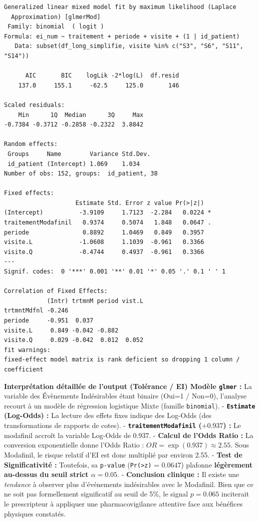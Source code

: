 \documentclass[
  letterpaper,
  DIV=11,
  numbers=noendperiod]{scrartcl}
\begin{document}
\begin{verbatim}
Generalized linear mixed model fit by maximum likelihood (Laplace
  Approximation) [glmerMod]
 Family: binomial  ( logit )
Formula: ei_num ~ traitement + periode + visite + (1 | id_patient)
   Data: subset(df_long_simplifie, visite %in% c("S3", "S6", "S11", "S14"))

      AIC       BIC    logLik -2*log(L)  df.resid 
    137.0     155.1     -62.5     125.0       146 

Scaled residuals: 
    Min      1Q  Median      3Q     Max 
-0.7384 -0.3712 -0.2858 -0.2322  3.8842 

Random effects:
 Groups     Name        Variance Std.Dev.
 id_patient (Intercept) 1.069    1.034   
Number of obs: 152, groups:  id_patient, 38

Fixed effects:
                    Estimate Std. Error z value Pr(>|z|)  
(Intercept)          -3.9109     1.7123  -2.284   0.0224 *
traitementModafinil   0.9374     0.5074   1.848   0.0647 .
periode               0.8892     1.0469   0.849   0.3957  
visite.L             -1.0608     1.1039  -0.961   0.3366  
visite.Q             -0.4744     0.4937  -0.961   0.3366  
---
Signif. codes:  0 '***' 0.001 '**' 0.01 '*' 0.05 '.' 0.1 ' ' 1

Correlation of Fixed Effects:
            (Intr) trtmnM period vist.L
trtmntMdfnl -0.246                     
periode     -0.951  0.037              
visite.L     0.849 -0.042 -0.882       
visite.Q     0.029 -0.042  0.012  0.052
fit warnings:
fixed-effect model matrix is rank deficient so dropping 1 column / coefficient
\end{verbatim}

\textbf{Interprétation détaillée de l'output (Tolérance / EI) Modèle
\texttt{glmer} :} La variable des Évènements Indésirables étant binaire
(Oui=1 / Non=0), l'analyse recourt à un modèle de régression logistique
Mixte (famille \texttt{binomial}). - \textbf{\texttt{Estimate}
(Log-Odds) :} La lecture des effets fixes indique des Log-Odds (des
transformations de rapports de cotes). -
\textbf{\texttt{traitementModafinil} (\(+0.937\)) :} Le modafinil
accroît la variable Log-Odds de \(0.937\). - \textbf{Calcul de l'Odds
Ratio :} La conversion exponentielle donne l'Odds Ratio :
\(OR = \exp(0.937) \approx 2.55\). Sous Modafinil, le risque relatif
d'EI est donc multiplié par environ 2.55. - \textbf{Test de
Significativité :} Toutefois, sa \texttt{p-value}
(\texttt{Pr(\textgreater{}\textbar{}z\textbar{})} = \(0.0647\)) plafonne
\textbf{légèrement au-dessus du seuil strict \(\alpha=0.05\)}. -
\textbf{Conclusion clinique :} Il existe une \emph{tendance} à observer
plus d'événements indésirables avec le Modafinil. Bien que ce ne soit
pas formellement significatif au seuil de 5\%, le signal \(p=0.065\)
inciterait le prescripteur à appliquer une pharmacovigilance attentive
face aux bénéfices physiques constatés.
\end{document}
